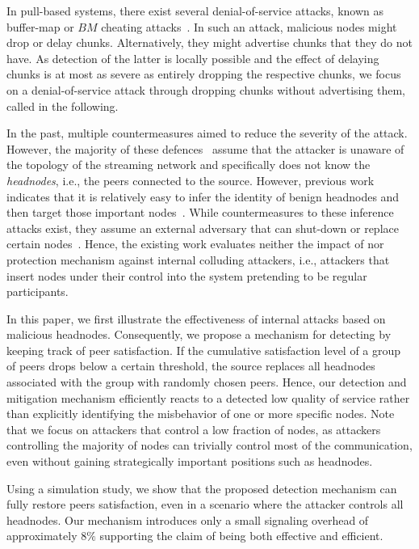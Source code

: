 In pull-based systems, there exist several denial-of-service attacks, known as buffer-map or $BM$ cheating attacks~\cite{cheatingAnalysis}. 
In such an attack, malicious nodes might drop or delay chunks. Alternatively, they might advertise chunks that they do not have. As detection of the latter is locally possible and the effect of delaying chunks is at most as severe as entirely dropping the respective chunks, we focus on a denial-of-service attack through dropping chunks without advertising them, called \drop in the following.  


In the past, multiple countermeasures aimed to reduce the severity of the \drop attack. However, the majority of these defences~\cite{zhang2005coolstreaming, defending2, antiliar} assume that the attacker is unaware of the topology of the streaming network and specifically does not know the \emph{headnodes}, i.e., the peers connected to the source. 
However, previous work indicates that it is relatively easy to infer the identity of benign headnodes and then target those important nodes~\cite{nguyen2016swap}.
While countermeasures to these inference attacks exist, they assume an external adversary that can shut-down or replace certain nodes~\cite{nguyen2016swap, rbcs, nguyen2014resilience}. 
Hence, the existing work evaluates neither the impact of nor protection mechanism against internal colluding attackers, i.e., attackers that insert nodes under their control into the system pretending to be regular participants. 


In this paper, we first illustrate the effectiveness of internal attacks based on malicious headnodes. 
Consequently, we propose a mechanism for detecting \drop by keeping track of peer satisfaction. If the cumulative satisfaction level of a group of peers drops below a certain threshold, the source replaces all headnodes associated with the group with randomly chosen peers. 
Hence, our detection and mitigation mechanism efficiently reacts to a detected low quality of service  rather than explicitly identifying the misbehavior of one or more specific nodes.
Note that we focus on attackers that control a low fraction of nodes, as attackers controlling the majority of nodes can trivially control most of the communication, even without gaining strategically important positions such as headnodes.    

Using a simulation study, we show that the proposed detection mechanism can fully restore peers satisfaction, even in a scenario where the attacker controls all headnodes. 
Our mechanism introduces only a small signaling overhead of approximately $8\%$ supporting the claim of being both effective and efficient.


